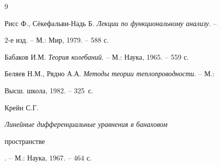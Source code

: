 \begin{thebibliography}{9} 


 




Рисс Ф., С\"екефальви-Надь Б. {\em Лекции по функциональному анализу}. -- 


2-е изд. -- М.: Мир, 1979. -- 588 с. 




Бабаков И.М. {\em Теория колебаний}. -- М.: Наука, 1965. -- 559 с. 




Беляев Н.М., Рядно А.А. {\em Методы теории теплопроводности}. -- М.: 


Высш. школа, 1982. -- 325~с. 




Крейн С.Г. {\em Линейные дифференциальные уравнения в банаховом 


пространстве}. -- М.: Наука, 1967. -- 464 с. 


 


\end{thebibliography} 


 


\vskip 1cm 


 








 


\label{end} 


 



